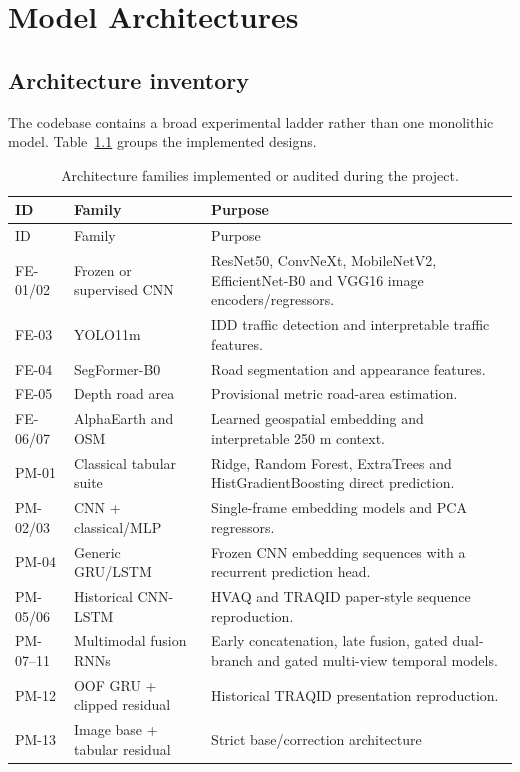 \documentclass[11pt,a4paper,oneside]{report}
\begin{document}
\chapter{Model Architectures}

\section{Architecture inventory}
The codebase contains a broad experimental ladder rather than one monolithic
model. Table~\ref{tab:architectureinventory} groups the implemented designs.

\begin{longtable}{p{}p{}p{}}
  \caption{Architecture families implemented or audited during the project.}
  \label{tab:architectureinventory}\\
  \toprule
  ID & Family & Purpose\\
  \midrule
  \endfirsthead
  \toprule
  ID & Family & Purpose\\
  \midrule
  \endhead
  FE-01/02 & Frozen or supervised CNN & ResNet50, ConvNeXt, MobileNetV2,
  EfficientNet-B0 and VGG16 image encoders/regressors.\\
  FE-03 & YOLO11m & IDD traffic detection and interpretable traffic features.\\
  FE-04 & SegFormer-B0 & Road segmentation and appearance features.\\
  FE-05 & Depth road area & Provisional metric road-area estimation.\\
  FE-06/07 & AlphaEarth and OSM & Learned geospatial embedding and interpretable
  250 m context.\\
  PM-01 & Classical tabular suite & Ridge, Random Forest, ExtraTrees and
  HistGradientBoosting direct prediction.\\
  PM-02/03 & CNN + classical/MLP & Single-frame embedding models and PCA
  regressors.\\
  PM-04 & Generic GRU/LSTM & Frozen CNN embedding sequences with a recurrent
  prediction head.\\
  PM-05/06 & Historical CNN-LSTM & HVAQ and TRAQID paper-style sequence
  reproduction.\\
  PM-07--11 & Multimodal fusion RNNs & Early concatenation, late fusion, gated
  dual-branch and gated multi-view temporal models.\\
  PM-12 & OOF GRU + clipped residual & Historical TRAQID presentation
  reproduction.\\
  PM-13 & Image base + tabular residual & Strict base/correction architecture

\end{longtable}
\end{document}
